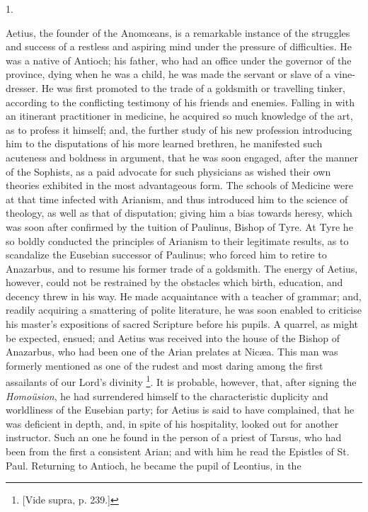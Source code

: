 1.

Aetius, the founder of the Anomœans, is a remarkable instance of
the struggles and success of a restless and aspiring mind under the
pressure of difficulties. He was a native of Antioch; his father, who
had an office under the governor of the province, dying when he was a
child, he was made the servant or slave of a vine-dresser. He was
first promoted to the trade of a goldsmith or travelling tinker,
according to the conflicting testimony of his friends and enemies.
Falling in with an itinerant practitioner in medicine, he acquired so
much knowledge of the art, as to profess it himself; and, the further
study of his new profession introducing him to the disputations of his
more learned brethren, he manifested such acuteness and boldness in
argument, that he was soon engaged, after the manner of the Sophists,
as a paid advocate for such physicians as wished their own theories
exhibited in the most advantageous form. The schools of Medicine were
at that time infected with Arianism, and thus introduced him to the
science of theology, as well as that of disputation; giving him a bias
towards heresy, which was soon after confirmed by the tuition of
Paulinus, Bishop of Tyre. At Tyre he so boldly conducted the
principles of Arianism to their legitimate results, as to scandalize
the Eusebian successor of Paulinus; who forced him to retire to
Anazarbus, and to resume his former trade of a goldsmith. The energy
of Aetius, however, could not be restrained by the obstacles which
birth, education, and decency threw in his way. He made acquaintance
with a teacher of grammar; and, readily acquiring a smattering of
polite literature, he was soon enabled to criticise his master's
expositions of sacred Scripture before his pupils. A quarrel, as might
be expected, ensued; and Aetius was received into the house of the
Bishop of Anazarbus, who had been one of the Arian prelates at Nicæa.
This man was formerly mentioned as one of the rudest and most daring
among the first assailants of our Lord's divinity \footnote{[Vide supra, p. 239.]}. It is probable, however, that, after signing the \emph{Homoüsion},
he had surrendered himself to the characteristic duplicity and
worldliness of the Eusebian party; for Aetius is said to have
complained, that he was deficient in depth, and, in spite of his
hospitality, looked out for another instructor. Such an one he found
in the person of a priest of Tarsus, who had been from the first a
consistent Arian; and with him he read the Epistles of St. Paul.
Returning to Antioch, he became the pupil of Leontius, in the
